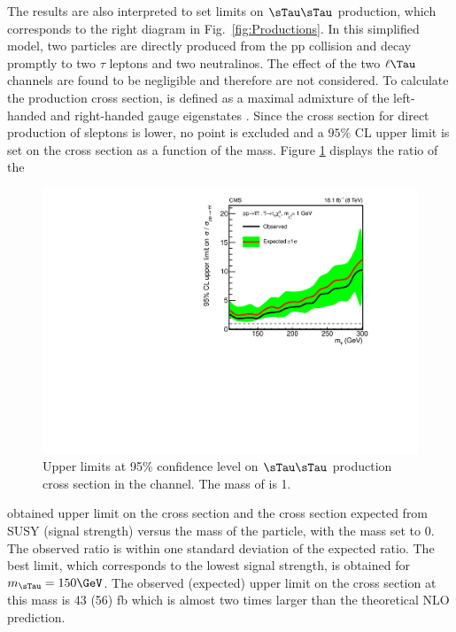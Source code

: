 The results are also interpreted to set limits on $\sTau\sTau$ production, 
which corresponds to the right diagram in Fig.~\ref{fig:Productions}. 
In this simplified model, two \sTau particles are directly produced from the pp  collision and decay promptly to two $\tau$ leptons and two neutralinos. 
The effect of the two $\ell\Tau$ channels are found to be negligible and therefore are not considered.
To calculate the production cross section, \sTau is 
defined as a maximal admixture of the left-handed and right-handed \sTau gauge eigenstates \cite{Fuks:2013lya}. 
Since the cross section for direct production of sleptons is lower, no point is excluded and a $95\%$ CL upper limit is set on 
the cross section  as a function of the \sTau mass. 
Figure \ref{fig:limit_stau_stau} displays the ratio of the 
\begin{linenomath}
\begin{figure}[!htb]
\centering
\includegraphics[width=1.0\textwidth,keepaspectratio=true]{StatisticsFig/ExclusionSTauSTauLsp1.pdf}
\caption{Upper limits at 95\% confidence level on $\sTau\sTau$ production cross section in the \tauTau channel. The mass of \PSGczDo is 1\GeV.}
\label{fig:limit_stau_stau}
\end{figure}
\end{linenomath}
obtained upper limit on the cross section and the cross section expected from SUSY (signal strength) versus the mass of the \sTau particle, with the \PSGczDo mass set to 0\GeV.
The observed ratio is within one standard deviation of  the expected ratio.
The best limit, which corresponds to the lowest signal strength, is obtained for $m_{\sTau}=150\GeV$. The observed (expected) upper limit on the cross section at this mass is 43 (56) fb which is almost two  times larger than the theoretical NLO prediction.




